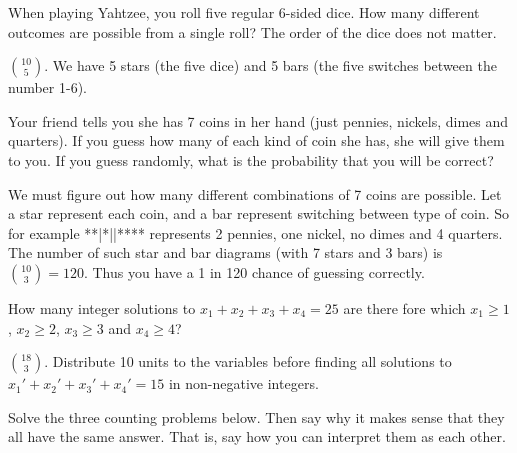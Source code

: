 \begin{questions}
\question When playing Yahtzee, you roll five regular 6-sided dice.  How many different outcomes are possible from a single roll?  The order of the dice does not matter.

	\begin{answer}
	${10 \choose 5}$.  We have 5 stars (the five dice) and 5 bars (the five switches between the number 1-6).
	\end{answer}
	
	

\question Your friend tells you she has 7 coins in her hand (just pennies, nickels, dimes and quarters).  If you guess how many of each kind of coin she has, she will give them to you.  If you guess randomly, what is the probability that you will be correct?

	\begin{answer}
	 We must figure out how many different combinations of 7 coins are possible.  Let a star represent each coin, and a bar represent switching between type of coin.  So for example **|*||**** represents 2 pennies, one nickel, no dimes and 4 quarters.  The number of such star and bar diagrams (with 7 stars and 3 bars) is ${10 \choose 3} = 120$.  Thus you have a 1 in 120 chance of guessing correctly.
	\end{answer}



\question How many integer solutions to $x_1 + x_2 + x_3 + x_4  = 25$ are there fore which $x_1 \ge 1$, $x_2 \ge 2$, $x_3 \ge 3$  and $x_4 \ge 4$?

	\begin{answer}
	${18 \choose 3}$.  Distribute 10 units to the variables before finding all solutions to $x_1' + x_2' + x_3' + x_4' = 15$ in non-negative integers.
	\end{answer}
	




\question Solve the three counting problems below.  Then say why it makes sense that they all have the same answer.  That is, say how you can interpret them as each other.

\end{questions}
